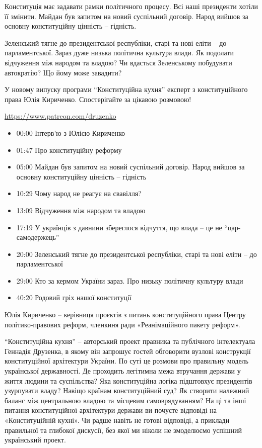 \begin{multicols}{2}

Конституція має задавати рамки політичного процесу. Всі наші президенти хотіли
її змінити. Майдан був запитом на новий суспільний договір. Народ вийшов за
основну конституційну цінність – гідність.

Зеленський тягне до президентської  республіки, старі та нові еліти – до
парламентської. Зараз дуже низька політична культура влади. Як подолати
відчуження між народом та владою? Чи вдасться Зеленському побудувати
автократію? Що йому може завадити?

У новому випуску програми \enquote{Конституційна кухня} експерт з
конституційного права Юлія Кириченко. Спостерігайте за цікавою розмовою!

\url{https://www.patreon.com/druzenko}

\begin{itemize}
  \item 00:00 Інтерв’ю з Юлією Кириченко 
  \item 01:47 Про конституційну реформу 
  \item 05:00 Майдан був запитом на новий суспільний договір. Народ вийшов за основну конституційну цінність – гідність
  \item 10:29 Чому народ не реагує на свавілля?
  \item 13:09 Відчуження між народом та владою
  \item 17:19 У українців з давнини збереглося відчуття, що влада – це не \enquote{цар-самодержець}
  \item 20:00 Зеленський тягне до президентської  республіки, старі та нові еліти – до парламентської
  \item 29:00 Кто за кермом України зараз. Про низьку політичну культуру влади
  \item 40:20 Родовий гріх нашої конституції
\end{itemize}

Юлія Кириченко – керівниця проєктів з питань конституційного права Центру
політико-правових реформ, членкиня ради «Реанімаційного пакету реформ».

\enquote{Конституційна кухня} – авторський проект правника та публічного інтелектуала
Геннадія Друзенка, в якому він запрошує гостей обговорити вузлові конструкції
конституційної архітектури України. По суті це розмови про правильну модель
української державності. Де проходить легітимна межа втручання держави у життя
людини та суспільства? Яка конституційна логіка підштовхує президентів
узурпувати владу? Навіщо країнам конституційний суд? Як створити належний
баланс між центральною владою та місцевим самоврядуванням? На ці та інші
питання конституційної архітектури держави ви почуєте відповіді на
«Конституційній кухні». Чи радше навіть не готові відповіді, а приклади
правильної та глибокої дискусії, без якої ми ніколи не змоделюємо успішний
український проект.

\end{multicols}

